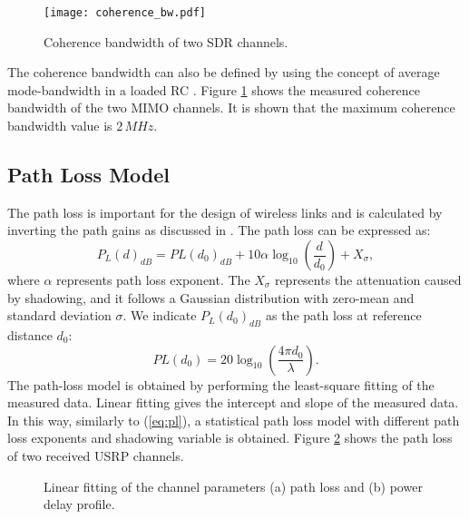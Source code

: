 \documentclass[10pt, final, journal, letterpaper, oneside, twocolumn]{IEEEtran}
\begin{document}
\begin{figure}
    \centering
    \texttt{[image: coherence\_bw.pdf]}
    \caption{Coherence bandwidth of two SDR channels.}
    \label{fig:ch_bw}
\end{figure}

The coherence bandwidth can also be defined by using the concept of average mode-bandwidth in a loaded RC \cite{chen2011estimation}\cite{delangre2008delay}. 
Figure \ref{fig:ch_bw} shows the measured coherence bandwidth of the two MIMO channels. It is shown that the maximum coherence bandwidth value is $2\,MHz$.

\subsection{Path Loss Model}
The path loss is important for the design of wireless links and is calculated by inverting the path gains as discussed in \cite{kim2013large}. The path loss can be expressed as:
\begin{equation}
    P_L(d)_{dB}=PL(d_0)_{dB}+10\alpha\log_{10}\left(\frac{d}{d_0} \right)+X_{\sigma},
     \label{eq:pl}
\end{equation}
where $\alpha$ represents path loss exponent. The $X_{\sigma}$ represents the attenuation caused by shadowing, and it follows a Gaussian distribution with zero-mean and standard deviation $\sigma$. We indicate $P_L(d_0)_{dB}$ as the path loss at reference distance $d_0$:
\begin{equation}
    PL(d_0)=20\log_{10}\left(\frac{4\pi d_0}{\lambda} \right).
\end{equation}
The path-loss model is obtained by performing the least-square  fitting of the measured data. Linear fitting gives the intercept and slope of the measured data. In this way, similarly to (\ref{eq:pl}), a statistical path loss model with different path loss exponents and shadowing variable is obtained. 
Figure \ref{fig:pl_pdp} shows the path loss of two received USRP channels.
\begin{figure}
    \centering
    \caption{Linear fitting of the channel parameters (a) path loss and (b) power delay profile.}
    \label{fig:pl_pdp}
\end{figure}
\end{document}
